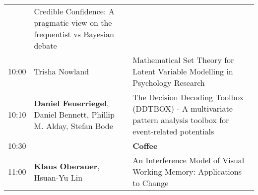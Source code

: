 \documentclass[]{article}
\begin{document}
\begin{longtable}[]{@{}lll@{}}
\begin{minipage}[t]{0.35\columnwidth}
\end{minipage} & \begin{minipage}[t]{0.53\columnwidth}\raggedright\strut
Credible Confidence: A pragmatic view on the frequentist vs Bayesian
debate\strut
\end{minipage}\tabularnewline
\begin{minipage}[t]{0.03\columnwidth}\raggedright\strut
10:00\strut
\end{minipage} & \begin{minipage}[t]{0.35\columnwidth}\raggedright\strut
Trisha Nowland\strut
\end{minipage} & \begin{minipage}[t]{0.53\columnwidth}\raggedright\strut
Mathematical Set Theory for Latent Variable Modelling in Psychology
Research\strut
\end{minipage}\tabularnewline
\begin{minipage}[t]{0.03\columnwidth}\raggedright\strut
10:10\strut
\end{minipage} & \begin{minipage}[t]{0.35\columnwidth}\raggedright\strut
\textbf{Daniel Feuerriegel}, Daniel Bennett, Phillip M. Alday, Stefan
Bode\strut
\end{minipage} & \begin{minipage}[t]{0.53\columnwidth}\raggedright\strut
The Decision Decoding Toolbox (DDTBOX) - A multivariate pattern analysis
toolbox for event-related potentials\strut
\end{minipage}\tabularnewline
\begin{minipage}[t]{0.03\columnwidth}\raggedright\strut
10:30\strut
\end{minipage} & \begin{minipage}[t]{0.35\columnwidth}\raggedright\strut
\strut
\end{minipage} & \begin{minipage}[t]{0.53\columnwidth}\raggedright\strut
\textbf{Coffee}\strut
\end{minipage}\tabularnewline
\begin{minipage}[t]{0.03\columnwidth}\raggedright\strut
11:00\strut
\end{minipage} & \begin{minipage}[t]{0.35\columnwidth}\raggedright\strut
\textbf{Klaus Oberauer}, Hsuan-Yu Lin\strut
\end{minipage} & \begin{minipage}[t]{0.53\columnwidth}\raggedright\strut
An Interference Model of Visual Working Memory: Applications to Change

\end{minipage}
\end{longtable}
\end{document}
